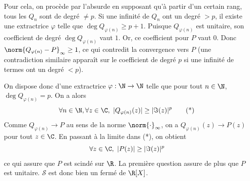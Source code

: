 \begin{solution}
\begin{enumerate}
        Pour cela, on procède par l'absurde en supposant qu'à partir d'un certain rang, tous les $Q_n$ sont de degré $\neq p$.
        Si une infinité de $Q_n$ ont un degré $> p$, il existe une extractrice $\varphi$ telle que $\deg Q_{\varphi(n)} \ge p+1$. 
        Puisque $Q_{\varphi(n)}$ est unitaire, son coefficient de degré $\deg Q_{\varphi(n)}$ vaut $1$. Or, ce coefficient pour $P$ vaut $0$.
        Donc $\norm{Q_{\varphi(n)} - P}_\infty \ge 1$, ce qui contredit la convergence vers $P$ (une contradiction similaire apparaît sur le coefficient de degré $p$ si une infinité de termes ont un degré $< p$).
        
        On dispose donc d'une extractrice $\varphi:\N\to\N$ telle que pour tout $n\in\N$, $\deg Q_{\varphi(n)}=p$.
        On a alors 
        \[
            \forall n\in\N,\forall z\in\C,\ |Q_{\varphi(n)}(z)|\geq|\Im(z)|^p    \tag*{(*)}
        \]
        Comme $Q_{\varphi(n)} \to P$ au sens de la norme $\norm{\cdot}_\infty$, on a $Q_{\varphi(n)}(z) \to P(z)$ pour tout $z \in \C$. 
        En passant à la limite dans (*), on obtient
        \[
            \forall z\in\C,\ |P(z)|\geq|\Im(z)|^p
        \]
        ce qui assure que $P$ est scindé sur $\R$. La première question assure de plus que $P$ est unitaire. $\mathcal S$ est donc bien un fermé de $\R[X]$.
    \end{enumerate}
\end{solution}